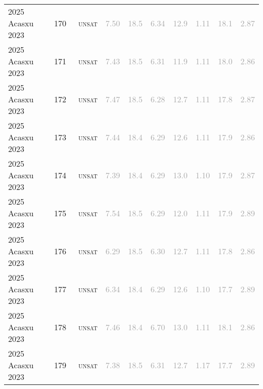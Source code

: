 \begin{center}
{\begin{longtable}{@{}llllllllll@{}}
2025 Acasxu 2023 & 170 & ~\textsc{unsat} & \textcolor{darkgray}{7.50} & \textcolor{darkgray}{18.5} & \textcolor{darkgray}{6.34} & \textcolor{darkgray}{12.9} & \textcolor{darkgray}{1.11} & \textcolor{darkgray}{18.1} & \textcolor{darkgray}{2.87} \\
2025 Acasxu 2023 & 171 & ~\textsc{unsat} & \textcolor{darkgray}{7.43} & \textcolor{darkgray}{18.5} & \textcolor{darkgray}{6.31} & \textcolor{darkgray}{11.9} & \textcolor{darkgray}{1.11} & \textcolor{darkgray}{18.0} & \textcolor{darkgray}{2.86} \\
2025 Acasxu 2023 & 172 & ~\textsc{unsat} & \textcolor{darkgray}{7.47} & \textcolor{darkgray}{18.5} & \textcolor{darkgray}{6.28} & \textcolor{darkgray}{12.7} & \textcolor{darkgray}{1.11} & \textcolor{darkgray}{17.8} & \textcolor{darkgray}{2.87} \\
2025 Acasxu 2023 & 173 & ~\textsc{unsat} & \textcolor{darkgray}{7.44} & \textcolor{darkgray}{18.4} & \textcolor{darkgray}{6.29} & \textcolor{darkgray}{12.6} & \textcolor{darkgray}{1.11} & \textcolor{darkgray}{17.9} & \textcolor{darkgray}{2.86} \\
2025 Acasxu 2023 & 174 & ~\textsc{unsat} & \textcolor{darkgray}{7.39} & \textcolor{darkgray}{18.4} & \textcolor{darkgray}{6.29} & \textcolor{darkgray}{13.0} & \textcolor{darkgray}{1.10} & \textcolor{darkgray}{17.9} & \textcolor{darkgray}{2.87} \\
2025 Acasxu 2023 & 175 & ~\textsc{unsat} & \textcolor{darkgray}{7.54} & \textcolor{darkgray}{18.5} & \textcolor{darkgray}{6.29} & \textcolor{darkgray}{12.0} & \textcolor{darkgray}{1.11} & \textcolor{darkgray}{17.9} & \textcolor{darkgray}{2.89} \\
2025 Acasxu 2023 & 176 & ~\textsc{unsat} & \textcolor{darkgray}{6.29} & \textcolor{darkgray}{18.5} & \textcolor{darkgray}{6.30} & \textcolor{darkgray}{12.7} & \textcolor{darkgray}{1.11} & \textcolor{darkgray}{17.8} & \textcolor{darkgray}{2.86} \\
2025 Acasxu 2023 & 177 & ~\textsc{unsat} & \textcolor{darkgray}{6.34} & \textcolor{darkgray}{18.4} & \textcolor{darkgray}{6.29} & \textcolor{darkgray}{12.6} & \textcolor{darkgray}{1.10} & \textcolor{darkgray}{17.7} & \textcolor{darkgray}{2.89} \\
2025 Acasxu 2023 & 178 & ~\textsc{unsat} & \textcolor{darkgray}{7.46} & \textcolor{darkgray}{18.4} & \textcolor{darkgray}{6.70} & \textcolor{darkgray}{13.0} & \textcolor{darkgray}{1.11} & \textcolor{darkgray}{18.1} & \textcolor{darkgray}{2.86} \\
2025 Acasxu 2023 & 179 & ~\textsc{unsat} & \textcolor{darkgray}{7.38} & \textcolor{darkgray}{18.5} & \textcolor{darkgray}{6.31} & \textcolor{darkgray}{12.7} & \textcolor{darkgray}{1.17} & \textcolor{darkgray}{17.7} & \textcolor{darkgray}{2.89} \\

\end{longtable}}
\end{center}
